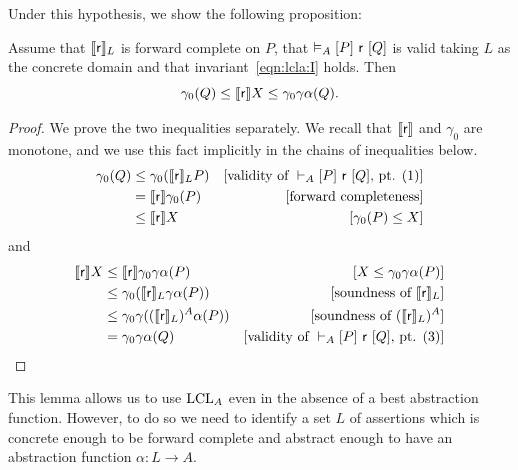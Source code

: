 Under this hypothesis, we show the following proposition:

\begin{prop}\label{prop:lcla:no-alpha-soundness}
	Assume that $\llbracket\mathsf{r}\rrbracket_L$ is forward complete on $P$, that $\vDash_{A}\nobreak[P]~\mathsf{r}~[Q]$ is valid taking $L$ as the concrete domain and that invariant~\eqref{eqn:lcla:I} holds.
	Then
	\[
	\gamma_0(Q) \le \llbracket\mathsf{r}\rrbracket X \le \gamma_0\gamma\alpha(Q) \text{.}
	\]
\end{prop}
\begin{proof}
	We prove the two inequalities separately. We recall that $\llbracket\mathsf{r}\rrbracket$ and $\gamma_0$ are monotone, and we use this fact implicitly in the chains of inequalities below.
	\begin{align*}
		\gamma_0 (Q) & \le \gamma_0 (\llbracket\mathsf{r}\rrbracket_L P) & [\text{validity of }\vdash_{A}\nobreak[P]~\mathsf{r}~[Q]\text{, pt. (1)}] \\
		             & = \llbracket\mathsf{r}\rrbracket \gamma_0(P)      & [\text{forward completeness}]                             \\
		             & \le \llbracket\mathsf{r}\rrbracket X              & [\gamma_0(P) \le X]
	\end{align*}
	and
	\begin{align*}
		\llbracket\mathsf{r}\rrbracket X & \le \llbracket\mathsf{r}\rrbracket \gamma_0 \gamma \alpha(P)         & [X \le \gamma_0 \gamma \alpha(P)]                         \\
		                & \le \gamma_0 (\llbracket\mathsf{r}\rrbracket_L \gamma\alpha(P))      & [\text{soundness of }\llbracket\mathsf{r}\rrbracket_L]                     \\
		                & \le \gamma_0 \gamma ((\llbracket\mathsf{r}\rrbracket_L)^A \alpha(P)) & [\text{soundness of }(\llbracket\mathsf{r}\rrbracket_L)^A]                 \\
		                & = \gamma_0 \gamma \alpha(Q)                         & [\text{validity of }\vdash_{A}\nobreak[P]~\mathsf{r}~[Q]\text{, pt. (3)}]
	\end{align*}
\end{proof}

This lemma allows us to use $\text{LCL}_A$ even in the absence of a best abstraction function. However, to do so we need to identify a set $L$ of assertions which is concrete enough to be forward complete and abstract enough to have an abstraction function $\alpha: L \rightarrow A$.

